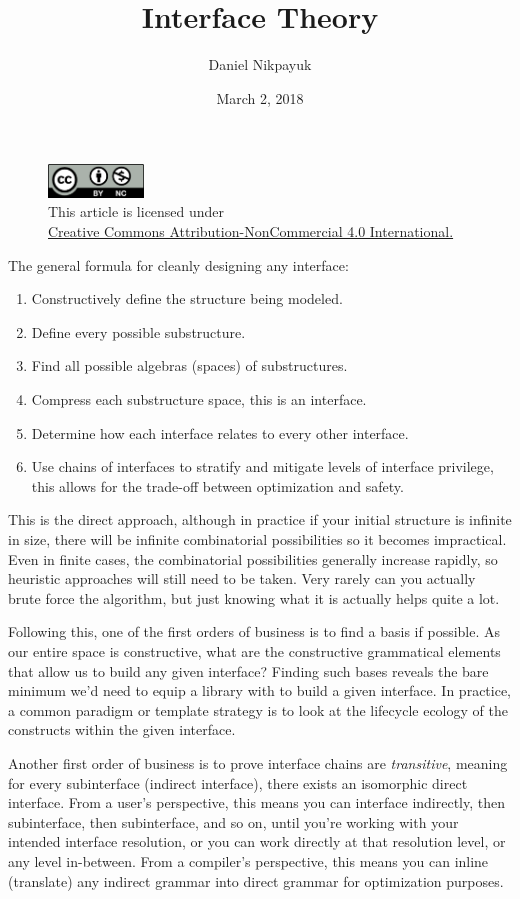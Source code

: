 \documentclass[twoside]{article}
\title{Interface Theory}
\author{Daniel Nikpayuk}
\date{March 2, 2018}
\begin{document}
\maketitle
\thispagestyle{empty}

\begin{figure}[h]
\centering
\includegraphics[width=1in]{cc-by-nc.png}\\[0.1in]
\tiny This article is licensed under \\
\href{http://creativecommons.org/licenses/by-nc/4.0/}
{Creative Commons Attribution-NonCommercial 4.0 International.}\\[0.3in]
\end{figure}

The general formula for cleanly designing any interface:

\begin{enumerate}
\item Constructively define the structure being modeled.
\item Define every possible substructure.
\item Find all possible algebras (spaces) of substructures.
\item Compress each substructure space, this is an interface.
\item Determine how each interface relates to every other interface.
\item Use chains of interfaces to stratify and mitigate levels of interface privilege,
      this allows for the trade-off between optimization and safety.
\end{enumerate}

This is the direct approach, although in practice if your initial structure is infinite in size, there will be infinite combinatorial
possibilities so it becomes impractical. Even in finite cases, the combinatorial possibilities generally increase rapidly,
so heuristic approaches will still need to be taken. Very rarely can you actually brute force the algorithm,
but just knowing what it is actually helps quite a lot.

Following this, one of the first orders of business is to find a basis if possible. As our entire space is constructive,
what are the constructive grammatical elements that allow us to build any given interface? Finding such bases reveals
the bare minimum we'd need to equip a library with to build a given interface. In practice, a common paradigm or template
strategy is to look at the lifecycle ecology of the constructs within the given interface.

Another first order of business is to prove interface chains are \emph{transitive}, meaning for every subinterface
(indirect interface), there exists an isomorphic direct interface. From a user's perspective, this means you can interface
indirectly, then subinterface, then subinterface, and so on, until you're working with your intended interface resolution,
or you can work directly at that resolution level, or any level in-between. From a compiler's perspective, this means
you can inline (translate) any indirect grammar into direct grammar for optimization purposes.
\end{document}
